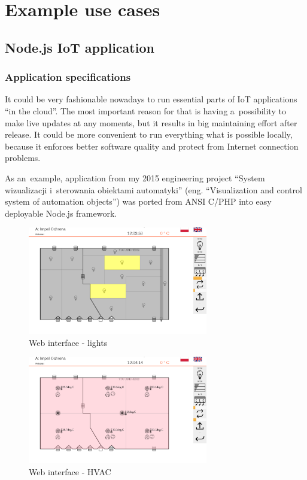 \documentclass[printmode]{mgr}
\begin{document}






\chapter{Example use cases}


\section{Node.js IoT application}

\subsection*{Application specifications}

It could be very fashionable nowadays to run essential parts of IoT applications ``in the cloud''.
The most important reason for that is having a~possibility to make live updates at any moments, but it results in big maintaining effort after release.
It could be more convenient to run everything what is possible locally, because it enforces better software quality and protect from Internet connection problems.

As an~example, application from my 2015 engineering project ``System wizualizacji i~sterowania obiektami automatyki''\cite{book:cdynak-scada} (eng. ``Visualization and control system of automation objects'') was ported from ANSI C/PHP into easy deployable Node.js framework.



\begin{figure}[htbp]
  \centering
    \includegraphics[width=0.7\textwidth]{4-web.png}
    \caption{Web interface - lights}
  \label{fig:4-web}
\end{figure}


\begin{figure}[htbp]
  \centering
    \includegraphics[width=0.7\textwidth]{5-web.png}
    \caption{Web interface - HVAC}
  \label{fig:5-web}
\end{figure}
\end{document}
